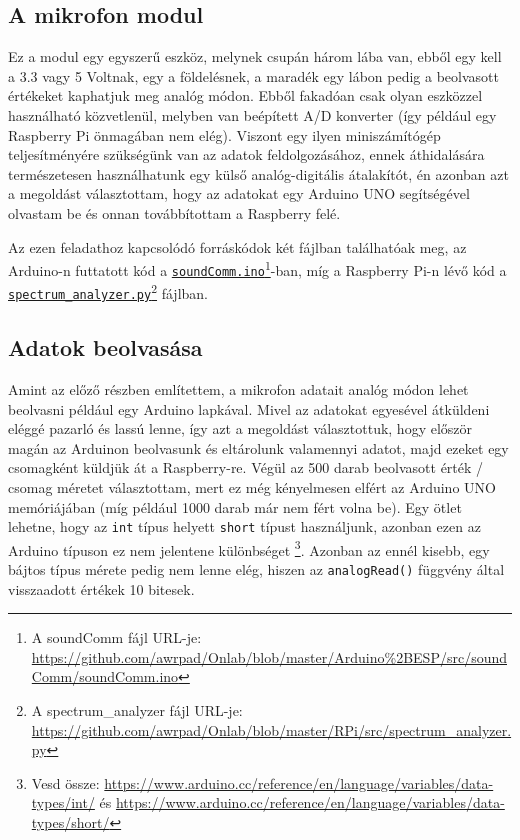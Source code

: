 \documentclass[12pt,a4paper]{article}
\begin{document}
    \subsection{A mikrofon modul}
      Ez a modul egy egyszerű eszköz, melynek csupán három lába van, ebből egy kell a 3.3 vagy 5 Voltnak, egy a földelésnek, a maradék egy lábon pedig a beolvasott értékeket kaphatjuk meg analóg módon. Ebből fakadóan csak olyan eszközzel használható közvetlenül, melyben van beépített A/D konverter (így például egy Raspberry Pi önmagában nem elég). Viszont egy ilyen miniszámítógép teljesítményére szükségünk van az adatok feldolgozásához, ennek áthidalására természetesen használhatunk egy külső analóg-digitális átalakítót, én azonban azt a megoldást választottam, hogy az adatokat egy Arduino UNO segítségével olvastam be és onnan továbbítottam a Raspberry felé.

      Az ezen feladathoz kapcsolódó forráskódok két fájlban találhatóak meg, az Arduino-n futtatott kód a \href{https://github.com/awrpad/Onlab/blob/master/Arduino\%2BESP/src/soundComm/soundComm.ino}{\texttt{soundComm.ino}}\footnote{A soundComm fájl URL-je: \url{https://github.com/awrpad/Onlab/blob/master/Arduino\%2BESP/src/soundComm/soundComm.ino}}-ban, míg a Raspberry Pi-n lévő kód a \href{https://github.com/awrpad/Onlab/blob/master/RPi/src/spectrum\_analyzer.py}{\texttt{spectrum\_analyzer.py}}\footnote{A spectrum\_analyzer fájl URL-je: \url{https://github.com/awrpad/Onlab/blob/master/RPi/src/spectrum\_analyzer.py}} fájlban.

    \subsection{Adatok beolvasása}
      Amint az előző részben említettem, a mikrofon adatait analóg módon lehet beolvasni például egy Arduino lapkával. Mivel az adatokat egyesével átküldeni eléggé pazarló és lassú lenne, így azt a megoldást választottuk, hogy először magán az Arduinon beolvasunk és eltárolunk valamennyi adatot, majd ezeket egy csomagként küldjük át a Raspberry-re. Végül az 500 darab beolvasott érték / csomag méretet választottam, mert ez még kényelmesen elfért az Arduino UNO memóriájában (míg például 1000 darab már nem fért volna be). Egy ötlet lehetne, hogy az \texttt{int} típus helyett \texttt{short} típust használjunk, azonban ezen az Arduino típuson ez nem jelentene különbséget \footnote{Vesd össze: \url{https://www.arduino.cc/reference/en/language/variables/data-types/int/} és \url{https://www.arduino.cc/reference/en/language/variables/data-types/short/}}. Azonban az ennél kisebb, egy bájtos típus mérete pedig nem lenne elég, hiszen az \texttt{analogRead()} függvény által visszaadott értékek 10 bitesek.
\end{document}

